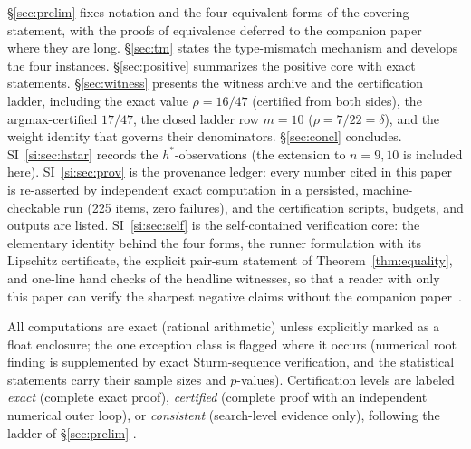 \S\ref{sec:prelim} fixes notation and the four equivalent forms of the
covering statement, with the proofs of equivalence deferred to the
companion paper~\cite{companion-monograph} where they are long. \S\ref{sec:tm} states the
type-mismatch mechanism and develops the four instances.
\S\ref{sec:positive} summarizes the positive core with exact statements.
\S\ref{sec:witness} presents the witness archive and the certification
ladder, including the exact value $\rho=16/47$ (certified from both
sides), the argmax-certified $17/47$, the closed ladder row $m=10$
($\rho=7/22=\delta$), and
the weight identity that governs their denominators.
\S\ref{sec:concl} concludes. SI~\ref{si:sec:hstar} records the
$h^*$-observations (the extension to $n=9,10$ is included here).
SI~\ref{si:sec:prov} is the provenance ledger: every number cited in
this paper is re-asserted by independent exact computation in a
persisted, machine-checkable run (225 items, zero failures), and the
certification scripts, budgets, and outputs are listed.
SI~\ref{si:sec:self} is the self-contained verification core: the
elementary identity behind the four forms, the runner formulation with
its Lipschitz certificate, the explicit pair-sum statement of
Theorem~\ref{thm:equality}, and one-line hand checks of the headline
witnesses, so that a reader with only this paper can verify the sharpest
negative claims without the companion paper~\cite{companion-monograph}.

All computations are exact (rational arithmetic) unless explicitly marked
as a float enclosure; the one exception class is flagged where it occurs
(numerical root finding is supplemented by exact Sturm-sequence
verification, and the statistical statements carry their sample sizes and
$p$-values). Certification levels are labeled \emph{exact}
(complete exact proof), \emph{certified} (complete proof with an
independent numerical outer loop), or \emph{consistent} (search-level
evidence only), following the ladder of \S\ref{sec:prelim}
\cite{prog-artifacts}.
